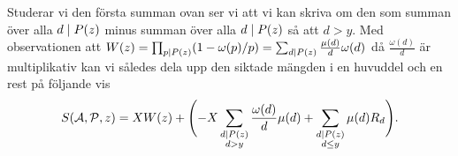 Studerar vi den första summan ovan ser vi att vi kan skriva om den som summan över alla \(d \mid P(z)\) minus summan över alla \(d \mid P(z)\) så att \(d > y\).
Med observationen att \(W(z) = \prod_{p \mid P(z)} (1 - \omega(p)/p) = \sum_{d \mid P(z)} \frac{\mu(d)}{d} \omega(d)\) då \(\frac{\omega(d)}{d}\) är multiplikativ kan vi således dela upp den siktade mängden i en huvuddel och en rest på följande vis
\begin{align*}
    S(\mathcal{A}, \mathcal{P}, z) = X W(z) + \Biggl(- X \sum_{\substack{d \mid P(z) \\ d > y}} \frac{\omega(d)}{d} \mu(d) + \sum_{\substack{d \mid P(z)  \\ d \leq y}} \mu(d) R_d \Biggr).
\end{align*}

